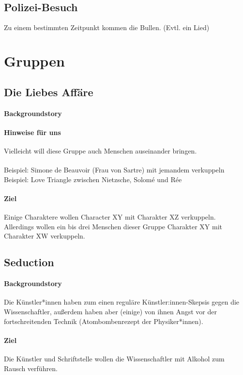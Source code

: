 \documentclass[12pt, a4paper, openany]{report}
\begin{document}
\section{Polizei-Besuch}
Zu einem bestimmten Zeitpunkt kommen die Bullen. (Evtl. ein Lied)

\chapter{Gruppen}
\section{Die Liebes Affäre}
\subsubsection{Backgroundstory}
\subsubsection{Hinweise für uns}
Vielleicht will diese Gruppe auch Menschen auseinander bringen.\\\\
Beispiel: Simone de Beauvoir (Frau von Sartre) mit jemandem verkuppeln\\
Beispiel: Love Triangle zwischen Nietzsche, Solomé und Rée
\subsubsection{Ziel}
Einige Charaktere wollen Character XY mit Charakter XZ verkuppeln.
Allerdings wollen ein bis drei Menschen dieser Gruppe Charakter XY mit Charakter XW verkuppeln.

\section{Seduction}
\subsubsection {Backgroundstory}
Die Künstler*innen haben zum einen reguläre Künstler:innen-Skepsis gegen die Wissenschaftler, außerdem haben aber (einige) von ihnen Angst vor der fortschreitenden Technik (Atombombenrezept der Physiker*innen).

\subsubsection {Ziel}
Die Künstler und Schriftstelle wollen die Wissenschaftler mit Alkohol zum Rausch verführen.
\end{document}
